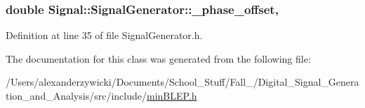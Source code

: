 \hypertarget{classSignal_1_1SignalGenerator_a6b4444d46747c8517171edbbf4b5588f}{
\subsubsection[{\+\_\+phase\+\_\+offset}]{\setlength{\rightskip}{0pt plus 5cm}double Signal\+::\+Signal\+Generator\+::\+\_\+phase\+\_\+offset\hspace{0.3cm}{\ttfamily [protected]}, {\ttfamily [inherited]}}}\label{classSignal_1_1SignalGenerator_a6b4444d46747c8517171edbbf4b5588f}


Definition at line 35 of file Signal\+Generator.\+h.



The documentation for this class was generated from the following file\+:\begin{DoxyCompactItemize}
\item 
/\+Users/alexanderzywicki/\+Documents/\+School\+\_\+\+Stuff/\+Fall\+\_/\+Digital\+\_\+\+Signal\+\_\+\+Generation\+\_\+and\+\_\+\+Analysis/src/include/\hyperlink{minBLEP_8h}{min\+B\+L\+E\+P.\+h}\end{DoxyCompactItemize}
